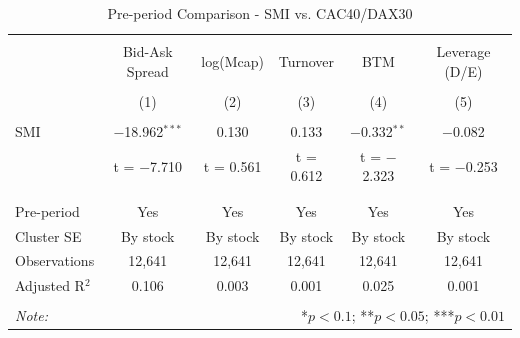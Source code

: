 
\begin{table}[!htbp] \centering 
  \caption{Pre-period Comparison - SMI vs. CAC40/DAX30} 
  \label{tab:pre-period} 
\begin{tabular}{@{\extracolsep{5pt}}lccccc} 
\\[-1.8ex]\hline 
\hline \\[-1.8ex] 
 & Bid-Ask Spread & log(Mcap) & Turnover & BTM & Leverage (D/E) \\ 
\\[-1.8ex] & (1) & (2) & (3) & (4) & (5)\\ 
\hline \\[-1.8ex] 
 SMI & $-$18.962$^{***}$ & 0.130 & 0.133 & $-$0.332$^{**}$ & $-$0.082 \\ 
  & t = $-$7.710 & t = 0.561 & t = 0.612 & t = $-$2.323 & t = $-$0.253 \\ 
  & & & & & \\ 
\hline \\[-1.8ex] 
Pre-period & Yes & Yes & Yes & Yes & Yes \\ 
Cluster SE & By stock & By stock & By stock & By stock & By stock \\ 
Observations & 12,641 & 12,641 & 12,641 & 12,641 & 12,641 \\ 
Adjusted R$^{2}$ & 0.106 & 0.003 & 0.001 & 0.025 & 0.001 \\ 
\hline 
\hline \\[-1.8ex] 
\textit{Note:}  & \multicolumn{5}{r}{*$p < 0.1$; **$p < 0.05$; ***$p < 0.01$} \\ 
\end{tabular} 
\end{table} 
